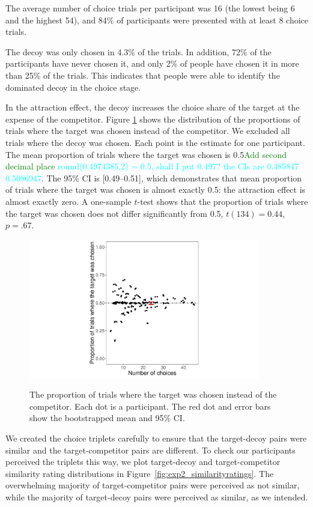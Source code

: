 \documentclass[12pt, a4paper]{article}
\newcommand{\NS}[1] {{\textcolor{green}{#1}}}
\newcommand{\AT}[1] {{\textcolor{cyan}{#1}}}
\begin{document}
The average number of choice trials per participant was 16 (the lowest being 6 and the highest 54), and 84\% of participants were presented with at least 8 choice trials.

The decoy was only chosen in 4.3\% of the trials. In addition, 72\% of the participants have never chosen it, and only 2\% of people have chosen it in more than 25\% of the trials. This indicates that people were able to identify the dominated decoy in the choice stage.

In the attraction effect, the decoy increases the choice share of the target at the expense of the competitor. Figure \ref{fig:exp2_res} shows the distribution of the proportions of trials where the target was chosen instead of the competitor. We excluded all trials where the decoy was chosen. Each point is the estimate for one participant. The mean proportion of trials where the target was chosen is 0.5\NS{Add second decimal place} \AT{round(0.4974385,2) = 0.5, shall I put 0.497? the CIs are 0.485847 0.5086947}. The 95\% CI is [0.49--0.51], which demonstrates that mean proportion of trials where the target was chosen is almost exactly 0.5: the attraction effect is almost exactly zero. A one-sample $t$-test shows that the proportion of trials where the target was chosen does not differ significantly from 0.5, $t(134)=0.44$, $p=.67$.  

\begin{figure}[htb!]
\centering
\captionsetup{justification=centering}
\caption{The proportion of trials where the target was chosen instead of the competitor. Each dot is a participant. The red dot and error bars show the bootstrapped mean and 95\% CI.}
\includegraphics[width=0.9\textwidth]{figure4.pdf}
\label{fig:exp2_res}
\end{figure}

We created the choice triplets carefully to ensure that the target-decoy pairs were similar and the target-competitor pairs are different. To check our participants perceived the triplets this way, we plot target-decoy and target-competitor similarity rating distributions in Figure~\ref{fig:exp2_similarityratings}.  The overwhelming majority of target-competitor pairs were perceived as not similar, while the majority of target-decoy pairs were perceived as similar, as we intended.
\end{document}
